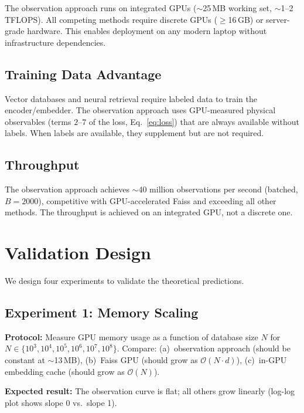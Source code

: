 \documentclass[11pt,twocolumn,a4paper]{article}
\newcommand{\BigO}{\mathcal{O}}
\begin{document}
The observation approach runs on integrated GPUs ($\sim$25\,MB working
set, $\sim$1--2\,TFLOPS). All competing methods require discrete GPUs
($\geq$16\,GB) or server-grade hardware. This enables deployment on
any modern laptop without infrastructure dependencies.

\subsection{Training Data Advantage}

Vector databases and neural retrieval require labeled data to train
the encoder/embedder. The observation approach uses GPU-measured
physical observables (terms $2$--$7$ of the loss, Eq.~\ref{eq:loss})
that are always available without labels. When labels are available,
they supplement but are not required.

\subsection{Throughput}

The observation approach achieves $\sim$40 million observations per
second (batched, $B = 2000$), competitive with GPU-accelerated
Faiss \citep{johnson2019} and exceeding all other methods. The
throughput is achieved on an integrated GPU, not a discrete one.


\section{Validation Design}
\label{sec:validation}

We design four experiments to validate the theoretical predictions.

\subsection{Experiment 1: Memory Scaling}

\textbf{Protocol:} Measure GPU memory usage as a function of database
size $N$ for $N \in \{10^3, 10^4, 10^5, 10^6, 10^7, 10^8\}$.
Compare: (a)~observation approach (should be constant at $\sim$13\,MB),
(b)~Faiss GPU (should grow as $\BigO(N \cdot d)$), (c)~in-GPU
embedding cache (should grow as $\BigO(N)$).

\textbf{Expected result:} The observation curve is flat; all others
grow linearly (log-log plot shows slope 0 vs.\ slope 1).
\end{document}
